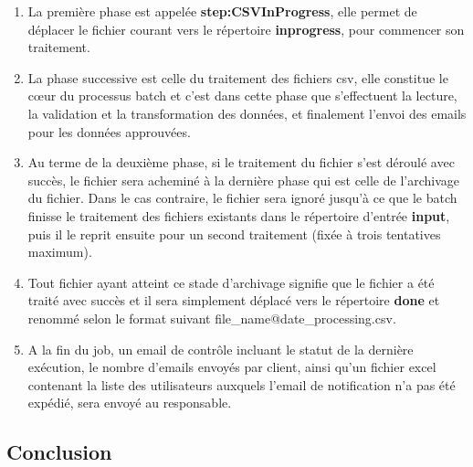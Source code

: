 \begin{enumerate}
    \item La première phase est appelée \textbf{step:CSVInProgress}, elle permet de déplacer le fichier courant vers le répertoire \textbf{inprogress}, pour commencer son traitement.
    \item La phase successive est celle du traitement des fichiers csv, elle constitue le cœur du processus batch et c'est dans cette phase que s'effectuent la lecture, la validation et la transformation des données, et finalement l'envoi des emails pour les données approuvées.
    \item Au terme de la deuxième phase, si le traitement du fichier s'est déroulé avec succès, le fichier sera acheminé à la dernière phase qui est celle de l'archivage du fichier. Dans le cas contraire, le fichier sera ignoré jusqu'à ce que le batch finisse le traitement des fichiers existants dans le répertoire d'entrée \textbf{input}, puis il le reprit ensuite pour un second traitement (fixée à trois tentatives maximum).\\
    \item Tout fichier ayant atteint ce stade d'archivage signifie que le fichier a été traité avec succès et il sera simplement déplacé vers le répertoire \textbf{done} et renommé selon le format suivant file\_name@date\_processing.csv.
    \item A la fin du job, un email de contrôle incluant le statut de la dernière exécution, le nombre d'emails envoyés par client, ainsi qu'un fichier excel contenant la liste des utilisateurs auxquels l'email de notification n'a pas été expédié, sera envoyé au responsable.
\end{enumerate}
\subsection*{Conclusion}
